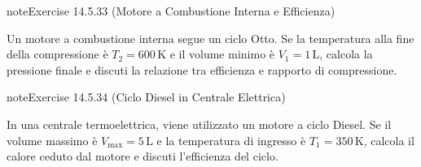 \documentclass[letterpaper,10pt,italian]{jupyterBook}
\begin{document}
\begin{sphinxadmonition}{note}{Exercise 14.5.33 (Motore a Combustione Interna e Efficienza)}



\sphinxAtStartPar
Un motore a combustione interna segue un ciclo Otto. Se la temperatura alla fine della compressione è \(T_2 = 600 \, \text{K}\) e il volume minimo è \(V_1 = 1 \, \text{L}\), calcola la pressione finale e discuti la relazione tra efficienza e rapporto di compressione.
\end{sphinxadmonition}
 \label{exercise:ch/thermodynamics/heat-engine-problems-exercise-33}

\begin{sphinxadmonition}{note}{Exercise 14.5.34 (Ciclo Diesel in Centrale Elettrica)}



\sphinxAtStartPar
In una centrale termoelettrica, viene utilizzato un motore a ciclo Diesel. Se il volume massimo è \(V_{\text{max}} = 5 \, \text{L}\) e la temperatura di ingresso è \(T_1 = 350 \, \text{K}\), calcola il calore ceduto dal motore e discuti l’efficienza del ciclo.
\end{sphinxadmonition}
\end{document}
